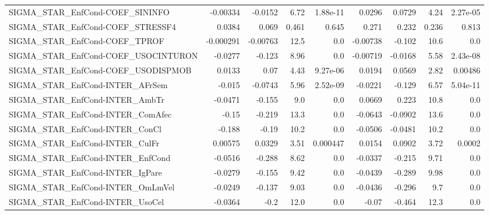 \begin{tabular}{lrrrrrrrr}
SIGMA\_STAR\_EnfCond-COEF\_SININFO       &    -0.00334 &      -0.0152 &     6.72 & 1.88e-11 &     0.0296 &      0.0729 &         4.24 &      2.27e-05 \\
SIGMA\_STAR\_EnfCond-COEF\_STRESSF4      &      0.0384 &        0.069 &    0.461 &    0.645 &      0.271 &       0.232 &        0.236 &         0.813 \\
SIGMA\_STAR\_EnfCond-COEF\_TPROF         &   -0.000291 &     -0.00763 &     12.5 &      0.0 &   -0.00738 &      -0.102 &         10.6 &           0.0 \\
SIGMA\_STAR\_EnfCond-COEF\_USOCINTURON   &     -0.0277 &       -0.123 &     8.96 &      0.0 &   -0.00719 &     -0.0168 &         5.58 &      2.43e-08 \\
SIGMA\_STAR\_EnfCond-COEF\_USODISPMOB    &      0.0133 &         0.07 &     4.43 & 9.27e-06 &     0.0194 &      0.0569 &         2.82 &       0.00486 \\
SIGMA\_STAR\_EnfCond-INTER\_AFrSem       &      -0.015 &      -0.0743 &     5.96 & 2.52e-09 &    -0.0221 &      -0.129 &         6.57 &      5.04e-11 \\
SIGMA\_STAR\_EnfCond-INTER\_AmbTr        &     -0.0471 &       -0.155 &      9.0 &      0.0 &     0.0669 &       0.223 &         10.8 &           0.0 \\
SIGMA\_STAR\_EnfCond-INTER\_ComAfec      &       -0.15 &       -0.219 &     13.3 &      0.0 &    -0.0643 &     -0.0902 &         13.6 &           0.0 \\
SIGMA\_STAR\_EnfCond-INTER\_ConCl        &      -0.188 &        -0.19 &     10.2 &      0.0 &    -0.0506 &     -0.0481 &         10.2 &           0.0 \\
SIGMA\_STAR\_EnfCond-INTER\_CulFr        &     0.00575 &       0.0329 &     3.51 & 0.000447 &     0.0154 &      0.0902 &         3.72 &        0.0002 \\
SIGMA\_STAR\_EnfCond-INTER\_EnfCond      &     -0.0516 &       -0.288 &     8.62 &      0.0 &    -0.0337 &      -0.215 &         9.71 &           0.0 \\
SIGMA\_STAR\_EnfCond-INTER\_IgPare       &     -0.0279 &       -0.155 &     9.42 &      0.0 &    -0.0439 &      -0.289 &         9.98 &           0.0 \\
SIGMA\_STAR\_EnfCond-INTER\_OmLmVel      &     -0.0249 &       -0.137 &     9.03 &      0.0 &    -0.0436 &      -0.296 &          9.7 &           0.0 \\
SIGMA\_STAR\_EnfCond-INTER\_UsoCel       &     -0.0364 &         -0.2 &     12.0 &      0.0 &      -0.07 &      -0.464 &         12.3 &           0.0 \\

\end{tabular}
